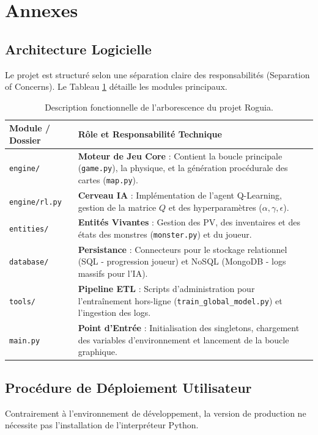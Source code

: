 \documentclass[12pt,a4paper]{article}
\begin{document}
\newpage
\appendix
\section{Annexes}

\subsection{Architecture Logicielle}
Le projet est structuré selon une séparation claire des responsabilités (Separation of Concerns). Le Tableau \ref{tab:structure} détaille les modules principaux.

\begin{table}[H]
    \centering
    \renewcommand{\arraystretch}{1.3}
    \begin{tabular}{@{}l|p{10cm}@{}}
        \toprule
        \textbf{Module / Dossier} & \textbf{Rôle et Responsabilité Technique} \\ \midrule
        \texttt{engine/} & \textbf{Moteur de Jeu Core} : Contient la boucle principale (\texttt{game.py}), la physique, et la génération procédurale des cartes (\texttt{map.py}). \\ \hline
        \texttt{engine/rl.py} & \textbf{Cerveau IA} : Implémentation de l'agent Q-Learning, gestion de la matrice $Q$ et des hyperparamètres ($\alpha, \gamma, \epsilon$). \\ \hline
        \texttt{entities/} & \textbf{Entités Vivantes} : Gestion des PV, des inventaires et des états des monstres (\texttt{monster.py}) et du joueur. \\ \hline
        \texttt{database/} & \textbf{Persistance} : Connecteurs pour le stockage relationnel (SQL - progression joueur) et NoSQL (MongoDB - logs massifs pour l'IA). \\ \hline
        \texttt{tools/} & \textbf{Pipeline ETL} : Scripts d'administration pour l'entraînement hors-ligne (\texttt{train\_global\_model.py}) et l'ingestion des logs. \\ \hline
        \texttt{main.py} & \textbf{Point d'Entrée} : Initialisation des singletons, chargement des variables d'environnement et lancement de la boucle graphique. \\
        \bottomrule
    \end{tabular}
    \caption{Description fonctionnelle de l'arborescence du projet Roguia.}
    \label{tab:structure}
\end{table}

\subsection{Procédure de Déploiement Utilisateur}
Contrairement à l'environnement de développement, la version de production ne nécessite pas l'installation de l'interpréteur Python.
\end{document}
